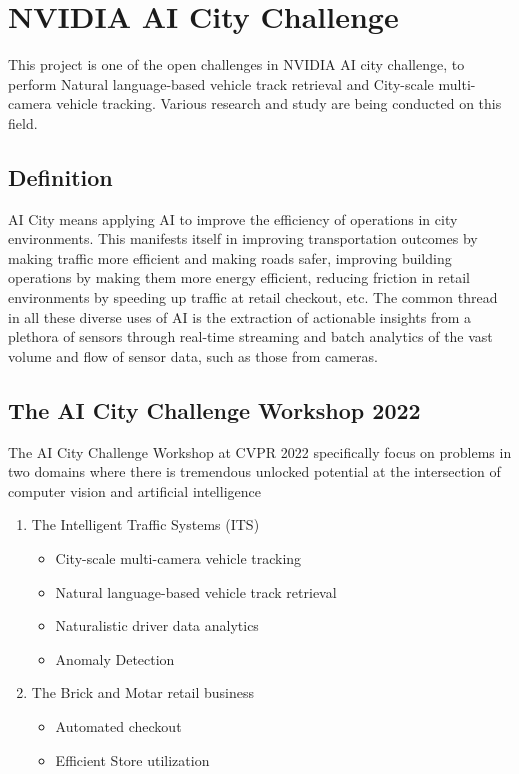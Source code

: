 \section{NVIDIA AI City Challenge}
This project is one of the open challenges in NVIDIA AI city challenge, to perform Natural language-based vehicle track retrieval and City-scale multi-camera vehicle tracking. Various research and study are being conducted on this field.

\subsection*{Definition}
AI City means applying AI to improve the efficiency of operations in city environments. This manifests itself in improving transportation outcomes by making traffic more efficient and making roads safer, improving building operations by making them more energy efficient, reducing friction in retail environments by speeding up traffic at retail checkout, etc. The common thread in all these diverse uses of AI is the extraction of actionable insights from a plethora of sensors through real-time streaming and batch analytics of the vast volume and flow of sensor data, such as those from cameras.

\subsection*{The AI City Challenge Workshop 2022}
The AI City Challenge Workshop at CVPR 2022 specifically focus on problems in two domains where there is tremendous unlocked potential at the intersection of computer vision and artificial intelligence
\begin{enumerate}
	\item The Intelligent Traffic Systems (ITS)
	\begin{itemize}
		\item City-scale multi-camera vehicle tracking
		\item Natural language-based vehicle track retrieval
		\item Naturalistic driver data analytics
		\item Anomaly Detection
	\end{itemize}
	\item The Brick and Motar retail business
	\begin{itemize}
		\item Automated checkout
		\item Efficient Store utilization
	\end{itemize}
\end{enumerate}

